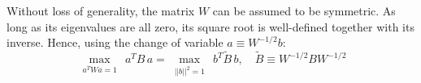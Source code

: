 

Without loss of generality, the matrix $W$ can be assumed to be symmetric. As long
as its eigenvalues are all zero, its square root is well-defined together with
its inverse. Hence, using the change of variable $a \equiv W^{-1/2} b$:
\begin{equation*}
\max_{\substack{a^T W a = 1}} \, a^T B\, a = \max_{\substack{||b||^2 = 1}}
    \, b^T \tilde{B}\, b, \quad \tilde{B} \equiv W^{-1/2} B W^{-1/2}
\end{equation*}